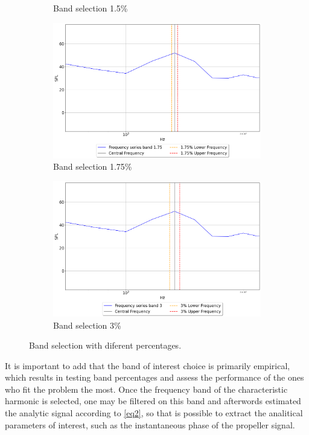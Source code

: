 \documentclass[10pt,fleqn,a4paper,twoside]{article}
\begin{document}
\begin{figure}
\begin{subfigure}{0.4\textwidth}
        \caption{Band selection 1.5\%}
        \label{fig:second}
    \end{subfigure}
    \hfill
    \centering
    \begin{subfigure}{0.4\textwidth}
        \includegraphics[width=\textwidth]{Figures/spectra_band_1.75.png}
        \caption{Band selection 1.75\%}
        \label{fig:third}
    \end{subfigure}
    \centering
    \hfill
    \begin{subfigure}{0.4\textwidth}
        \includegraphics[width=\textwidth]{Figures/spectra_band_3.png}
        \caption{Band selection 3\%}
        \label{fig:third}
    \end{subfigure}
            
    \caption{Band selection with diferent percentages.}
    \label{fig:figures}
    \end{figure}
It is important to add that the band of interest choice is primarily empirical, which results in testing band percentages and assess the performance of the ones who fit the problem the most. Once the frequency band of the characteristic harmonic is selected, one may be filtered on this band and afterwords estimated the analytic signal according to \ref{eq2}, so that is possible to extract the analitical parameters of interest, such as the instantaneous phase of the propeller signal.
\end{document}
